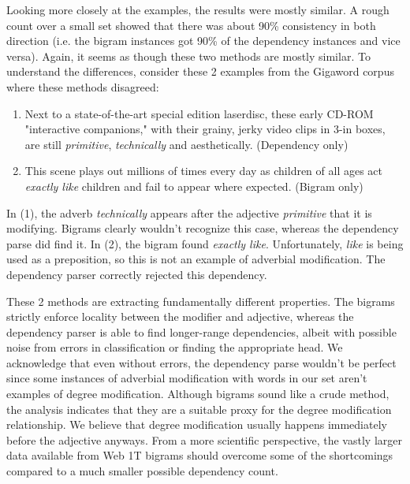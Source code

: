\documentclass[11pt]{amsart}
\begin{document}
Looking more closely at the examples, the results were mostly similar. A rough count over a small set showed that there was about 90\% consistency in both direction (i.e. the bigram instances got 90\% of the dependency instances and vice versa). Again, it seems as though these two methods are mostly similar. To understand the differences, consider these 2 examples from the Gigaword corpus where these methods disagreed:

\begin{enumerate}
\item Next to a state-of-the-art special edition laserdisc, these early CD-ROM "interactive companions," with their grainy, jerky video clips in 3-in boxes, are still \textit{primitive}, \textit{technically} and aesthetically. (Dependency only)
\item This scene plays out millions of times every day as children of all ages act \textit{exactly like} children and fail to appear where expected. (Bigram only)
\end{enumerate}

In (1), the adverb \textit{technically} appears after the adjective \textit{primitive} that it is modifying. Bigrams clearly wouldn't recognize this case, whereas the dependency parse did find it. In (2), the bigram found \textit{exactly like}. Unfortunately, \textit{like} is being used as a preposition, so this is not an example of adverbial modification. The dependency parser correctly rejected this dependency.

These 2 methods are extracting fundamentally different properties. The bigrams strictly enforce locality between the modifier and adjective, whereas the dependency parser is able to find longer-range dependencies, albeit with possible noise from errors in classification or finding the appropriate head. We acknowledge that even without errors, the dependency parse wouldn't be perfect since some instances of adverbial modification with words in our set aren't examples of degree modification. Although bigrams sound like a crude method, the analysis indicates that they are a suitable proxy for the degree modification relationship. We believe that degree modification usually happens immediately before the adjective anyways. From a more scientific perspective, the vastly larger data available from Web 1T bigrams should overcome some of the shortcomings compared to a much smaller possible dependency count. 
\end{document}
